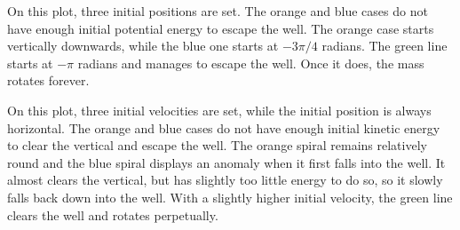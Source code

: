 \documentclass{article}
\begin{document}
\vspace{14pt}

\centering On this plot, three initial positions are set. The orange and blue cases do not have enough initial potential energy to escape the well. The orange case starts vertically downwards, while the blue one starts at $-3\pi/4$ radians. The green line starts at $-\pi$ radians and manages to escape the well. Once it does, the mass rotates forever. 

\begin{center}
%
\label{labelname}%
\end{center}

\centering On this plot, three initial velocities are set, while the initial position is always horizontal. The orange and blue cases do not have enough initial kinetic energy to clear the vertical and escape the well. The orange spiral remains relatively round and the blue spiral displays an anomaly when it first falls into the well. It almost clears the vertical, but has slightly too little energy to do so, so it slowly falls back down into the well. With a slightly higher initial velocity, the green line clears the well and rotates perpetually. 

\begin{center}
%
\label{labelname}%
\end{center}
\end{document}
